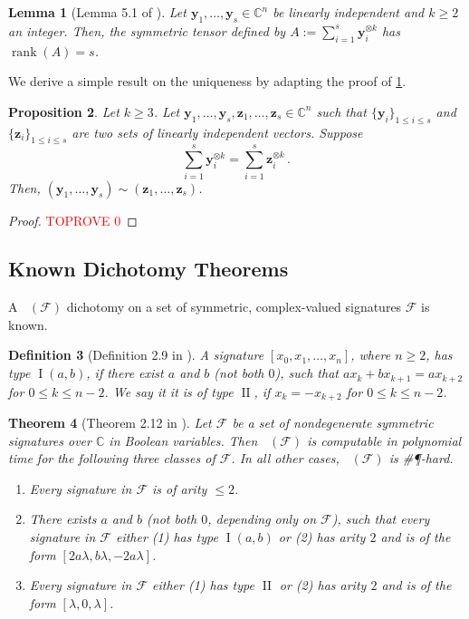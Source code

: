 \documentclass[11pt]{article}
\newtheorem{theorem}{Theorem}[section]
\newtheorem{lemma}[theorem]{Lemma}
\newtheorem{definition}[theorem]{Definition}
\newtheorem{proposition}[theorem]{Proposition}
\DeclareMathOperator{\holbs}{Holant^*_2}
\DeclareMathOperator{\rank}{rank}
\DeclareMathOperator{\typei}{I}
\DeclareMathOperator{\typeii}{II}
\begin{document}
\begin{lemma}[Lemma 5.1 of \cite{comon_symmetric_2008}]\label{lem:linearly-independent-tensor-rank}
  Let $\mathbf{y}_1, \ldots, \mathbf{y}_s \in \mathbb{C}^n$ be linearly independent and $k \ge 2$ an integer.
  Then, the symmetric tensor defined by $A := \sum_{i = 1}^{s} \mathbf{y}_i^{\otimes k}$ has $\rank(A) = s$.
\end{lemma}
We derive a simple result on the uniqueness by adapting the proof of \cref{lem:linearly-independent-tensor-rank}.
\begin{proposition}\label{prop:uniqueness-tensor-decomposition}
  Let $k \ge 3$.
  Let $\mathbf{y}_1, \ldots, \mathbf{y}_s, \mathbf{z}_1, \ldots, \mathbf{z}_s \in \mathbb{C}^n$ such that $\{\mathbf{y}_i\}_{1 \le i \le s}$ and $\{\mathbf{z}_i\}_{1 \le i \le s}$ are two sets of linearly independent vectors.
  Suppose
  \begin{equation}\label{eq:symmetric-sum-equal}
    \sum_{i = 1}^{s} \mathbf{y}_i^{\otimes k} = \sum_{i = 1}^{s} \mathbf{z}_i^{\otimes k} \, .
  \end{equation}
  Then, $(\mathbf{y}_1, \ldots, \mathbf{y}_s) \sim (\mathbf{z}_1, \ldots, \mathbf{z}_s)$.
\end{proposition}
\begin{proof}\textcolor{red}{TOPROVE 0}\end{proof}

\subsection{Known Dichotomy Theorems}
A $\holbs(\mathcal{F})$ dichotomy on a set of symmetric, complex-valued signatures $\mathcal{F}$ is known.
\begin{definition}[Definition 2.9 in \cite{cai_complexity_2017}]\label{def:boolean-signature-type-i-ii}
  A signature $[x_0, x_1, \ldots, x_n]$, where $n \ge 2$, has type $\typei(a, b)$, if there exist $a$ and $b$ (not both $0$), such that $a x_k + b x_{k+1} = a x_{k+2}$ for $0 \le k \le n -2$.
  We say it it is of type $\typeii$, if $x_k = - x_{k+2}$ for $0 \le k \le n - 2$.
\end{definition}
\begin{theorem}[Theorem 2.12 in \cite{cai_complexity_2017}]\label{thm:dich-sym-Boolean}
Let $\mathcal{F}$ be a set of nondegenerate symmetric signatures over $\mathbb{C}$ in Boolean variables.
Then $\holbs(\mathcal{F})$ is computable in polynomial time for the following three classes of $\mathcal{F}$.
In all other cases, $\holbs(\mathcal{F})$ is \#\P-hard.
\begin{enumerate}
  \item Every signature in $\mathcal{F}$ is of arity $\le 2$.
  \item There exists $a$ and $b$ (not both $0$, depending only on $\mathcal{F}$), such that every signature in $\mathcal{F}$ either (1) has type $\typei(a,b)$ or (2) has arity $2$ and is of the form $[2a \lambda, b \lambda, -2 a \lambda]$.
  \item Every signature in $\mathcal{F}$ either (1) has type $\typeii$ or (2) has arity $2$ and is of the form $[\lambda, 0, \lambda]$.
\end{enumerate}
\end{theorem}
\end{document}
